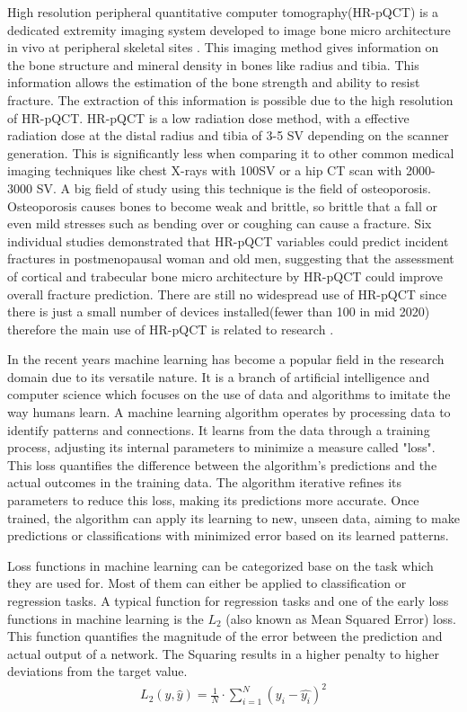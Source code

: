 \documentclass[
a4paper, 
12pt,
grayscalebody, %
abstract=on,
twoside, BCOR10mm, 12pt, DIV13,headinclude, footexclude, final, abstracton, openright
]{ibireprt}
\numberwithin{equation}{chapter}
\numberwithin{table}{chapter}
\numberwithin{figure}{chapter}
\numberwithin{algorithm}{chapter}
\numberwithin{example}{chapter}
\numberwithin{example}{chapter}
\begin{document}
High resolution peripheral quantitative computer tomography(HR-pQCT) is a  dedicated extremity imaging system developed to image bone micro architecture in vivo at peripheral skeletal sites \cite{Bergh2021}. This imaging method gives information on the bone structure and mineral density in bones like radius and tibia. This information allows the estimation of the bone strength and ability to resist fracture. The extraction of this information is possible due to the high resolution of HR-pQCT.%
HR-pQCT is a low radiation dose method, with a effective radiation dose at the distal radius and tibia of  3-5 \textmu SV depending on the scanner  generation. This is significantly less when comparing it to other common medical imaging techniques like chest X-rays with 100\textmu SV or a hip CT scan with 2000-3000 \textmu SV. A big field of study using this technique is the field of osteoporosis. Osteoporosis causes bones to become weak and brittle, so brittle that a fall or even mild stresses such as bending over or coughing can cause a fracture. Six individual studies demonstrated that HR-pQCT variables could predict incident fractures in postmenopausal woman and old men, suggesting that the assessment of cortical and trabecular bone micro architecture by HR-pQCT could improve overall fracture prediction. There are still no widespread use of HR-pQCT since there is just a small number of devices installed(fewer than 100 in mid 2020) therefore the main use of HR-pQCT is related to research \cite{Bergh2021}.


In the recent years machine learning has become a popular field in the research domain due to its versatile nature. It is a branch of artificial intelligence and computer science which focuses on the use of data and algorithms to imitate the way humans learn. A machine learning algorithm operates by processing data to identify patterns and connections. It learns from the data through a training process, adjusting its internal parameters to minimize a measure called "loss". This loss quantifies the difference between the algorithm's predictions and the actual outcomes in the training data. The algorithm iterative refines its parameters to reduce this loss, making its predictions more accurate. Once trained, the algorithm can apply its learning to new, unseen data, aiming to make predictions or classifications with minimized error based on its learned patterns.

Loss functions in machine learning can be categorized base on the task which they are used for. Most of them can either be applied to classification or regression tasks. A typical function for regression tasks and one of the early loss functions in machine learning is the $L_2$ (also known as Mean Squared Error) loss. This function quantifies the magnitude of the error between the prediction and actual output of a network. The Squaring results in a higher penalty to higher deviations from the target value. 
\begin{align}
	L_2(y,\hat{y})=\frac{1}{N}\cdot \sum^{N}_{i=1}(y_i-\hat{y_i})^2
\end{align}
\end{document}
